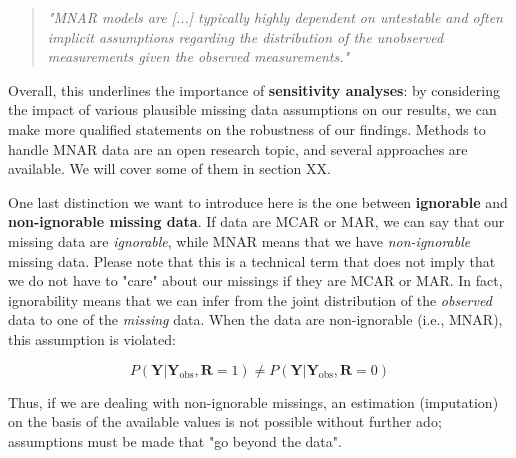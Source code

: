 \begin{quote}
    \emph{"MNAR models are [...] typically highly dependent on untestable and often implicit assumptions regarding the distribution of the unobserved measurements given the observed measurements."}
\end{quote}

Overall, this underlines the importance of \textbf{sensitivity analyses}: by considering the impact of various plausible missing data assumptions on our results, we can make more qualified statements on the robustness of our findings. Methods to handle MNAR data are an open research topic, and several approaches are available. We will cover some of them in section XX.

One last distinction we want to introduce here is the one between \textbf{ignorable} and \textbf{non-ignorable missing data}. If data are MCAR or MAR, we can say that our missing data are \emph{ignorable}, while MNAR means that we have \emph{non-ignorable} missing data. Please note that this is a technical term that does not imply that we do not have to "care" about our missings if they are MCAR or MAR. In fact, ignorability means that we can infer from the joint distribution of the \emph{observed} data to one of the \emph{missing} data. When the data are non-ignorable (i.e., MNAR), this assumption is violated:


\begin{equation}
P(\mathbf{Y}|\mathbf{Y}_{\text{obs}}, \mathbf{R}=1) \neq P(\mathbf{Y}|\mathbf{Y}_{\text{obs}}, \mathbf{R}=0)
\end{equation}

Thus, if we are dealing with non-ignorable missings, an estimation (imputation) on the basis of the available values is not possible without further ado; assumptions must be made that "go beyond the data".

